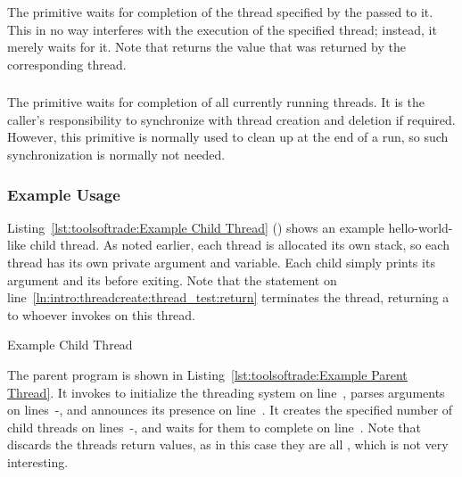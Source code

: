 The  primitive waits for completion of the thread
specified by the  passed to it.
This in no way interferes with the execution of the specified thread;
instead, it merely waits for it.
Note that  returns the value that was returned by
the corresponding thread.

\subsubsection{}

The 
primitive waits for completion of all currently running threads.
It is the caller's responsibility to synchronize with thread creation
and deletion if required.
However, this primitive is normally used to clean up at the end of
a run, so such synchronization is normally not needed.

\subsubsection{Example Usage}

Listing~\ref{lst:toolsoftrade:Example Child Thread} ()
shows an example hello-world-like child thread.
As noted earlier, each thread is allocated its own stack, so
each thread has its own private  argument and  variable.
Each child simply prints its argument and its 
before exiting.
Note that the  statement on
line~\ref{ln:intro:threadcreate:thread_test:return} terminates the thread,
returning a  to whoever invokes  on this
thread.

\begin{listing}[tbp]

\caption{Example Child Thread}
\label{lst:toolsoftrade:Example Child Thread}
\end{listing}

\begin{lineref}
The parent program is shown in
Listing~\ref{lst:toolsoftrade:Example Parent Thread}.
It invokes  to initialize the threading system on
line~,
parses arguments on lines~-,
and announces its presence on line~.
It creates the specified number of child threads on
lines~-,
and waits for them to complete on line~.
Note that  discards the threads return values,
as in this case they are all , which is not very interesting.
\end{lineref}

